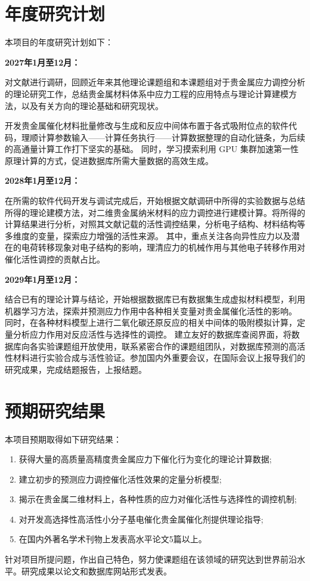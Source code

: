 \section{年度研究计划}
本项目的年度研究计划如下：

\textbf{2027年1月至12月：}

对文献进行调研，回顾近年来其他理论课题组和本课题组对于贵金属应力调控分析的理论研究工作，总结贵金属材料体系中应力工程的应用特点与理论计算建模方法，以及有关方向的理论基础和研究现状。

开发贵金属催化材料批量修改与生成和反应中间体布置于各式吸附位点的软件代码，理顺计算参数输入------计算任务执行------计算数据整理的自动化链条，为后续的高通量计算工作打下坚实的基础。
同时，学习摸索利用 GPU
集群加速第一性原理计算的方式，促进数据库所需大量数据的高效生成。

\textbf{2028年1月至12月：}

在所需的软件代码开发与调试完成后，开始根据文献调研中所得的实验数据与总结所得的理论建模方法，对二维贵金属纳米材料的应力调控进行建模计算。将所得的计算结果进行分析，对照其文献记载的活性调控结果，分析电子结构、材料结构等多维度的变量，探索应力增强的活性来源。
其中，重点关注各向异性应力以及潜在的电荷转移现象对电子结构的影响，理清应力的机械作用与其他电子转移作用对催化活性调控的贡献占比。

\textbf{2029年1月至12月：}

结合已有的理论计算与结论，开始根据数据库已有数据集生成虚拟材料模型，利用机器学习方法，探索并预测应力作用中各种相关变量对贵金属催化活性的影响。
同时，在各种材料模型上进行二氧化碳还原反应的相关中间体的吸附模拟计算，定量分析应力作用对反应活性与选择性的调控。
建立友好的数据库查阅界面，将数据库向各实验课题组开放使用，联系紧密合作的课题组团队，对数据库预测的高活性材料进行实验合成与活性验证。参加国内外重要会议，在国际会议上报导我们的研究成果，完成结题报告，上报结题。

\section{预期研究结果}
本项目预期取得如下研究结果：
\begin{enumerate}
	\item
	      获得大量的高质量高精度贵金属应力下催化行为变化的理论计算数据;
	\item
	      建立初步的预测应力调控催化活性效果的定量分析模型;
	\item
	      揭示在贵金属二维材料上，各种性质的应力对催化活性与选择性的调控机制;
	\item
	      对开发高选择性高活性小分子基电催化贵金属催化剂提供理论指导;
	\item
	      在国内外著名学术刊物上发表高水平论文5篇以上。
\end{enumerate}
针对项目所提问题，作出自己特色，努力使课题组在该领域的研究达到世界前沿水平。研究成果以论文和数据库网站形式发表。



